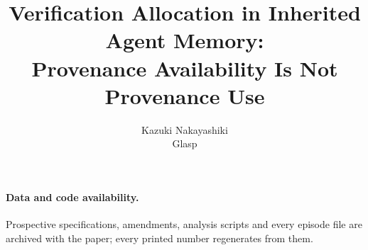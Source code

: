 \documentclass[11pt]{article}
\title{Verification Allocation in Inherited Agent Memory:\\
Provenance Availability Is Not Provenance Use}
\author{Kazuki Nakayashiki\\ \small Glasp}
\date{}
\begin{document}
\maketitle

\begin{abstract}

\end{abstract}











\paragraph{Data and code availability.} Prospective specifications, amendments, analysis
scripts and every episode file are archived with the paper; every printed number
regenerates from them.



\appendix





\end{document}
